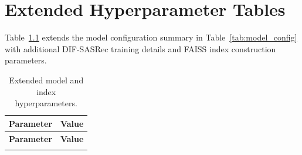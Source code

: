 \chapter{Extended Hyperparameter Tables}
\label{app:hyperparams}

Table~\ref{tab:app_model_config} extends the model configuration summary in Table~\ref{tab:model_config} with additional DIF-SASRec training details and FAISS index construction parameters.

\begin{longtable}{p{5.5cm} p{7.5cm}}
\caption{Extended model and index hyperparameters.}
\label{tab:app_model_config} \\
\hline
\textbf{Parameter} & \textbf{Value} \\
\hline
\endfirsthead
\hline
\textbf{Parameter} & \textbf{Value} \\
\hline
\endhead
\hline
\endfoot
\hline
\endlastfoot


\end{longtable}
